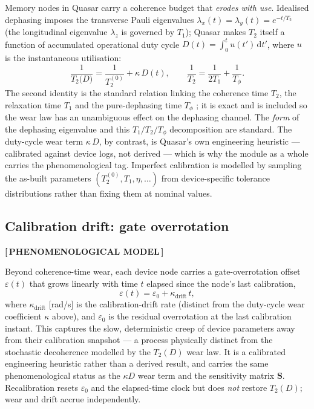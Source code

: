 \documentclass[11pt]{article}
\newcommand{\statusPhenom}{\textbf{\color{phenom}[\,PHENOMENOLOGICAL MODEL\,]}}
\newcommand{\dd}{\mathrm{d}}
\begin{document}
Memory nodes in Quasar carry a coherence budget that \emph{erodes with use}. Idealised
dephasing imposes the transverse Pauli eigenvalues $\lambda_x(t)=\lambda_y(t)=e^{-t/T_2}$
(the longitudinal eigenvalue $\lambda_z$ is governed by $T_1$); Quasar makes $T_2$ itself a
function of accumulated operational duty cycle $D(t)=\int_0^t u(t')\,\dd t'$, where $u$ is the
instantaneous utilisation:
\begin{equation}
\boxed{\;\frac{1}{T_2\!\big(D\big)}=\frac{1}{T_2^{(0)}}+\kappa\,D(t),\qquad
\frac{1}{T_2}=\frac{1}{2T_1}+\frac{1}{T_\phi}.\;}
\end{equation}
The second identity is the standard relation linking the coherence time $T_2$, the
relaxation time $T_1$ and the pure-dephasing time $T_\phi$ \cite{nielsenchuang}; it is exact
and is included so the wear law has an unambiguous effect on the dephasing channel. The
\emph{form} of the dephasing eigenvalue and this $T_1/T_2/T_\phi$ decomposition are standard.
The duty-cycle wear term $\kappa\,D$, by contrast, is Quasar's own engineering heuristic ---
calibrated against device logs, not derived --- which is why the module as a whole carries the
phenomenological tag. Imperfect calibration is modelled by sampling the as-built parameters
$(T_2^{(0)},T_1,\eta,\dots)$ from device-specific tolerance distributions rather than fixing
them at nominal values.

\subsection{Calibration drift: gate overrotation}
\statusPhenom

Beyond coherence-time wear, each device node carries a gate-overrotation offset $\varepsilon(t)$
that grows linearly with time $t$ elapsed since the node's last calibration,
\begin{equation}
\varepsilon(t)=\varepsilon_0+\kappa_{\mathrm{drift}}\,t,
\end{equation}
where $\kappa_{\mathrm{drift}}$ [rad/s] is the calibration-drift rate (distinct from the
duty-cycle wear coefficient $\kappa$ above), and $\varepsilon_0$ is the residual overrotation
at the last calibration instant. This captures the slow, deterministic creep of device
parameters away from their calibration snapshot --- a process physically distinct from the
stochastic decoherence modelled by the $T_2(D)$ wear law. It is a calibrated engineering
heuristic rather than a derived result, and carries the same phenomenological status as the
$\kappa D$ wear term and the sensitivity matrix $\mathbf{S}$. Recalibration resets
$\varepsilon_0$ and the elapsed-time clock but does \emph{not} restore $T_2(D)$; wear and
drift accrue independently.
\end{document}
